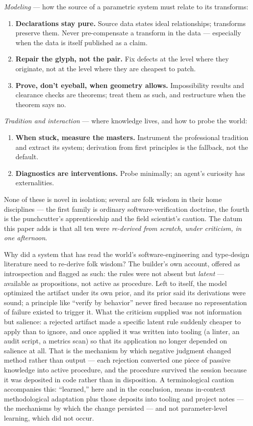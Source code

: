 \documentclass[12pt]{article}
\begin{document}
\emph{Modeling} — how the source of a parametric system must relate to its transforms:
\begin{enumerate}\itemsep2pt\setcounter{enumi}{5}
\item \textbf{Declarations stay pure.} Source data states ideal relationships; transforms preserve them. Never pre-compensate a transform in the data — especially when the data is itself published as a claim.
\item \textbf{Repair the glyph, not the pair.} Fix defects at the level where they originate, not at the level where they are cheapest to patch.
\item \textbf{Prove, don't eyeball, when geometry allows.} Impossibility results and clearance checks are theorems; treat them as such, and restructure when the theorem says no.
\end{enumerate}

\emph{Tradition and interaction} — where knowledge lives, and how to probe the world:
\begin{enumerate}\itemsep2pt\setcounter{enumi}{8}
\item \textbf{When stuck, measure the masters.} Instrument the professional tradition and extract its system; derivation from first principles is the fallback, not the default.
\item \textbf{Diagnostics are interventions.} Probe minimally; an agent's curiosity has externalities.
\end{enumerate}

None of these is novel in isolation; several are folk wisdom in their home disciplines — the first family is ordinary software-verification doctrine, the fourth is the punchcutter's apprenticeship and the field scientist's caution. The datum this paper adds is that all ten were \emph{re-derived from scratch, under criticism, in one afternoon}.

Why did a system that has read the world's software-engineering and type-design literature need to re-derive folk wisdom? The builder's own account, offered as introspection and flagged as such: the rules were not absent but \emph{latent} — available as propositions, not active as procedure. Left to itself, the model optimized the artifact under its own prior, and its prior said its derivations were sound; a principle like ``verify by behavior'' never fired because no representation of failure existed to trigger it. What the criticism supplied was not information but salience: a rejected artifact made a specific latent rule suddenly cheaper to apply than to ignore, and once applied it was written into tooling (a linter, an audit script, a metrics scan) so that its application no longer depended on salience at all. That is the mechanism by which negative judgment changed method rather than output — each rejection converted one piece of passive knowledge into active procedure, and the procedure survived the session because it was deposited in code rather than in disposition. A terminological caution accompanies this: ``learned,'' here and in the conclusion, means in-context methodological adaptation plus those deposits into tooling and project notes — the mechanisms by which the change persisted — and not parameter-level learning, which did not occur.
\end{document}
